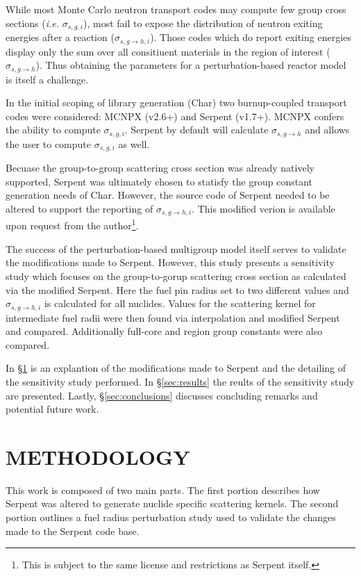 \documentclass{physor2012}
\begin{document}
While most Monte Carlo neutron transport codes may compute few group cross
sections (\emph{i.e.} $\sigma_{s,g,i}$), most fail to expose the distribution
of neutron exiting energies after a reaction ($\sigma_{s,g\to h,i}$).  Those
codes which do report exiting energies display only the sum over all consitiuent 
materials in the region of interest ($\sigma_{s,g\to h}$).  Thus obtaining 
the parameters for a perturbation-based reactor model is itself a challenge.

In the initial scoping of library generation (Char) two burnup-coupled transport 
codes were considered: MCNPX (v2.6+) and Serpent (v1.7+).  MCNPX confers the 
ability to compute $\sigma_{s,g,i}$.  Serpent by default will calculate 
$\sigma_{s,g\to h}$ and allows the user to compute $\sigma_{s,g,i}$ as well.

Becuase the group-to-group scattering cross section was already natively supported, 
Serpent was ultimately chosen to statisfy the group constant generation needs of
Char.  However, the source code of Serpent needed to be altered to support 
the reporting of $\sigma_{s,g\to h,i}$.  This modified verion is available upon
request from the author\footnote{This is subject to the same license and restrictions
as Serpent itself.}.

The success of the perturbation-based multigroup model itself serves to validate
the modifications made to Serpent.  However, this study presents a sensitivity study 
which focuses on the group-to-gorup scattering cross section as calculated via 
the modified Serpent.  Here the fuel pin radius set to two different values and 
$\sigma_{s,g\to h,i}$ is calculated for all nuclides.  Values for the scattering 
kernel for intermediate fuel radii were then found via interpolation and modified Serpent 
and compared.  Additionally full-core and region group constants were also compared.

In \S \ref{sec:methodology} is an explantion of the modifications made to Serpent 
and the detailing of the sensitivity study performed.  In \S \ref{sec:results} the 
reults of the sensitivity study are presented.  Lastly, \S \ref{sec:conclusions}
discusses concluding remarks and potential future work.

\section{METHODOLOGY} 
\label{sec:methodology}

This work is composed of two main parts.  The first portion describes how 
Serpent was altered to generate nuclide specific scattering kernels.  
The second portion outlines a fuel radius perturbation study used to 
validate the changes made to the Serpent code base.
\end{document}
